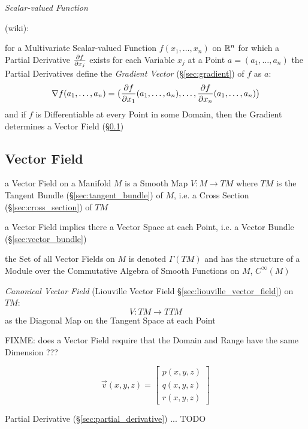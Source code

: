 \emph{Scalar-valued Function}

(wiki):

for a Multivariate Scalar-valued Function $f(x_1, \ldots, x_n)$ on $\mathbb{R}^n$
for which a Partial Derivative $\frac{\partial{f}}{\partial{x_j}}$ exists for each Variable $x_j$
at a Point $a = (a_1, \ldots, a_n)$ the Partial Derivatives define the
\emph{Gradient Vector} (\S\ref{sec:gradient}) of $f$ as $a$:
\[
  \nabla{f}(a_1, \ldots, a_n) = \big(
    \frac{\partial{f}}{\partial{x_1}}(a_1, \ldots, a_n), \ldots, \frac{\partial{f}}{\partial{x_n}}(a_1, \ldots, a_n)
  \big)
\]
and if $f$ is Differentiable at every Point in some Domain, then the Gradient
determines a Vector Field (\S\ref{sec:vector_field})



\subsection{Vector Field}\label{sec:vector_field}

a Vector Field on a Manifold $M$ is a Smooth Map $V : M \rightarrow T M$ where
$TM$ is the Tangent Bundle (\S\ref{sec:tangent_bundle}) of $M$, i.e. a Cross
Section (\S\ref{sec:cross_section}) of $TM$

\fist a Vector Field implies there a Vector Space at each Point, i.e. a Vector
Bundle (\S\ref{sec:vector_bundle})

the Set of all Vector Fields on $M$ is denoted $\Gamma(TM)$ and has the
structure of a Module over the Commutative Algebra of Smooth Functions on $M$,
$C^\infty(M)$

\emph{Canonical Vector Field} (Liouville Vector Field
\S\ref{sec:liouville_vector_field}) on $TM$:
\[
  V : TM \rightarrow TTM
\]
as the Diagonal Map on the Tangent Space at each Point

FIXME: does a Vector Field require that the Domain and Range have the same
Dimension ???

\begin{equation*}
  \vec{v}(x,y,z) = \begin{bmatrix}
    p(x,y,z) \\
    q(x,y,z) \\
    r(x,y,z)
  \end{bmatrix}
\end{equation*}

Partial Derivative (\S\ref{sec:partial_derivative}) ... TODO


